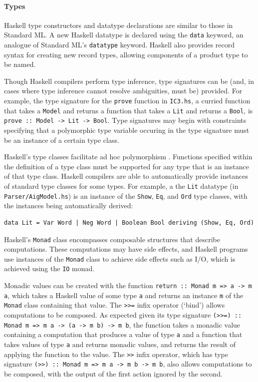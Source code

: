 \documentclass[12pt,a4paper,twoside,openright]{report}
\begin{document}
\paragraph{Types}{
Haskell type constructors and datatype declarations are similar to those in
Standard ML. A new Haskell datatype is declared using the \verb,data, keyword, an analogue
of Standard ML's \verb,datatype, keyword.
Haskell also provides record syntax for creating new record types, allowing components
of a product type to be named.

Though Haskell compilers perform type inference, type
signatures can be (and, in cases where type inference cannot resolve
ambiguities, must be) provided. For example, the type signature for
the \verb,prove, function in \verb,IC3.hs,, a curried function that takes
a \verb,Model, and returns a function that takes a \verb,Lit, and returns a \verb,Bool,,
is \verb,prove :: Model -> Lit -> Bool,. Type signatures may begin with
constraints specifying that a polymorphic type variable occuring in the type
signature must be an instance of a certain type class.


Haskell's type classes facilitate ad hoc polymorphism \cite{hall94}.
Functions specified within the definition of a type class
must be supported for any type that is an instance of that type class.
Haskell compilers are able to automatically provide instances of standard
type classes for some types.
For example, a the \verb,Lit, datatype (in \verb,Parser/AigModel.hs,) is an instance of
the \verb,Show,, \verb,Eq,, and \verb,Ord, type classes, with the instances being
automatically derived:
\begin{lstlisting}
data Lit = Var Word | Neg Word | Boolean Bool deriving (Show, Eq, Ord)
\end{lstlisting}

Haskell's \verb,Monad, class encompasses composable
structures that describe computations. These computations
may have side effects, and Haskell programs use instances of the
\verb,Monad, class to achieve side effects such as I/O, which is
achieved using the \verb,IO, monad.

Monadic values can be created with the function
\verb,return :: Monad m => a -> m a,, which takes a Haskell
value of some type \verb,a, and returns an instance \verb,m, of the
\verb,Monad, class containing that value.
The \verb,>>=, infix operator (`bind') allows computations to be composed.
As expected given its type signature
\verb,(>>=) :: Monad m => m a -> (a -> m b) -> m b,, the function
takes a monadic value containing a computation that produces a value of type
\verb,a, and a function that takes values of type \verb,a, and returns
monadic values, and returns the result of applying the function to the value.
The \verb,>>, infix operator, which has type signature
\verb,(>>) :: Monad m => m a -> m b -> m b,, also allows computations to be composed,
with the output of the first action ignored by the second.

}
\end{document}
